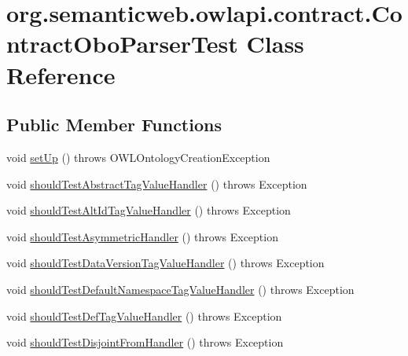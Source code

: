 \hypertarget{classorg_1_1semanticweb_1_1owlapi_1_1contract_1_1_contract_obo_parser_test}{\section{org.\-semanticweb.\-owlapi.\-contract.\-Contract\-Obo\-Parser\-Test Class Reference}
\label{classorg_1_1semanticweb_1_1owlapi_1_1contract_1_1_contract_obo_parser_test}
}
\subsection*{Public Member Functions}
\begin{DoxyCompactItemize}
\item 
void \hyperlink{classorg_1_1semanticweb_1_1owlapi_1_1contract_1_1_contract_obo_parser_test_ab96ba69257b1569f5db948c7bcc2bdc2}{set\-Up} ()  throws O\-W\-L\-Ontology\-Creation\-Exception 
\item 
void \hyperlink{classorg_1_1semanticweb_1_1owlapi_1_1contract_1_1_contract_obo_parser_test_a34ff76146dfa19da35fc2364c085b3e0}{should\-Test\-Abstract\-Tag\-Value\-Handler} ()  throws Exception 
\item 
void \hyperlink{classorg_1_1semanticweb_1_1owlapi_1_1contract_1_1_contract_obo_parser_test_af31131b3a9ef2bdaa904087be801bbb5}{should\-Test\-Alt\-Id\-Tag\-Value\-Handler} ()  throws Exception 
\item 
void \hyperlink{classorg_1_1semanticweb_1_1owlapi_1_1contract_1_1_contract_obo_parser_test_a16296cdfc87089a3779be770b0c9dc42}{should\-Test\-Asymmetric\-Handler} ()  throws Exception 
\item 
void \hyperlink{classorg_1_1semanticweb_1_1owlapi_1_1contract_1_1_contract_obo_parser_test_a2d97cccfb72c4b9e04939c24702de6f4}{should\-Test\-Data\-Version\-Tag\-Value\-Handler} ()  throws Exception 
\item 
void \hyperlink{classorg_1_1semanticweb_1_1owlapi_1_1contract_1_1_contract_obo_parser_test_a3e0097d1bc058c58bf03ffb289bf7aeb}{should\-Test\-Default\-Namespace\-Tag\-Value\-Handler} ()  throws Exception 
\item 
void \hyperlink{classorg_1_1semanticweb_1_1owlapi_1_1contract_1_1_contract_obo_parser_test_ada5d43f1846326068417b9b6cdde3b20}{should\-Test\-Def\-Tag\-Value\-Handler} ()  throws Exception 
\item 
void \hyperlink{classorg_1_1semanticweb_1_1owlapi_1_1contract_1_1_contract_obo_parser_test_af0bc1dec9015377e1a4504893af169b8}{should\-Test\-Disjoint\-From\-Handler} ()  throws Exception 

\end{DoxyCompactItemize}
